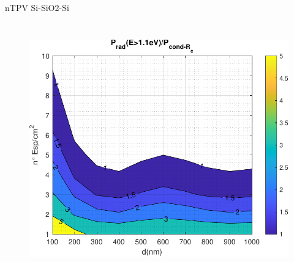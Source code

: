 \documentclass[spanish,a4paper]{beamer}%
\begin{document}
\begin{frame}{nTPV Si-SiO2-Si}
{\begin{columns}
\begin{figure}[h]
										\includegraphics[width=\columnwidth]{rel_SiSi11_Rc}%
								\label{fig:SiSiO2Si_relRc}%
						\end{figure}
						\vfill
				\end{columns}		
		}
	\end{frame}
	
\end{document}
